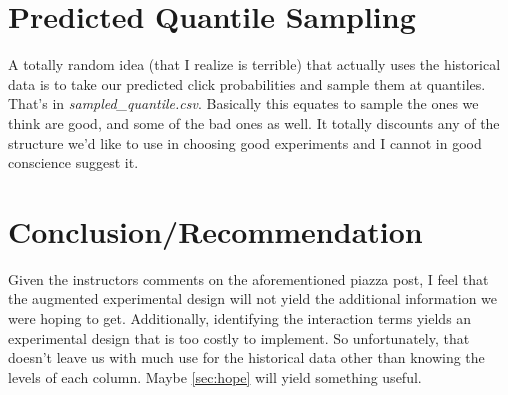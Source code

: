 \section{Predicted Quantile Sampling}
A totally random idea (that I realize is terrible) that actually uses the historical data is to take our predicted click probabilities and sample them at  quantiles.  That's in \textit{sampled\_quantile.csv}.  Basically this equates to sample the ones we think are good, and some of the bad ones as well.  It totally discounts any of the structure we'd like to use in choosing good experiments and I cannot in good conscience suggest it.

\section{Conclusion/Recommendation}
Given the instructors comments on the aforementioned piazza post, I feel that the augmented experimental design will not yield the additional information we were hoping to get.  Additionally, identifying the interaction terms yields an experimental design that is too costly to implement.  So unfortunately, that doesn't leave us with much use for the historical data other than knowing the levels of each column.  Maybe \vref{sec:hope} will yield something useful.



% 


